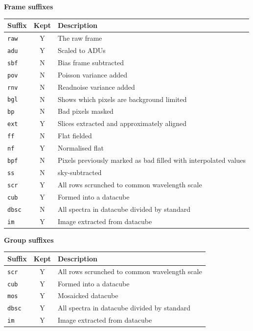 \documentclass[twoside,11pt]{article}
\renewcommand{\_}{\texttt{\symbol{95}}}
\begin{document}
\textbf{Frame suffixes}

\vspace{0.2cm}

\begin{tabular}{l c l}
\hline
Suffix & Kept & Description \hspace{9cm}  \\
\hline
{\tt \_raw} & Y & The raw frame\\
{\tt \_adu} & Y & Scaled to ADUs\\
{\tt \_sbf} & N & Bias frame subtracted\\
{\tt \_pov} & N & Poisson variance added\\
{\tt \_rnv} & N & Readnoise variance added\\
{\tt \_bgl} & N & Shows which pixels are background limited\\
{\tt \_bp}  & N & Bad pixels masked\\
{\tt \_ext} & Y & Slices extracted and approximately aligned\\
{\tt \_ff}  & N & Flat fielded\\
{\tt \_nf}  & Y & Normalised flat\\
{\tt \_bpf} & N & Pixels previously marked as bad filled with
interpolated values\\
{\tt \_ss}  & N & sky-subtracted\\
{\tt \_scr} & Y & All rows scrunched to common wavelength scale\\
{\tt \_cub} & Y & Formed into a datacube\\
{\tt \_dbsc} & N & All spectra in datacube divided by standard\\
{\tt \_im}  & Y & Image extracted from datacube\\
\hline
\end{tabular}

\vspace{0.5cm}

\textbf{Group suffixes}

\vspace{0.2cm}

\begin{tabular}{l c l}
\hline
Suffix & Kept & Description \hspace{9cm} \\
\hline
{\tt \_scr} & Y & All rows scrunched to common wavelength scale\\
{\tt \_cub} & Y & Formed into a datacube\\
{\tt \_mos} & Y & Mosaicked datacube\\
{\tt \_dbsc} & Y & All spectra in datacube divided by standard\\
{\tt \_im}  & Y & Image extracted from datacube\\
\hline
\end{tabular}
\end{document}
